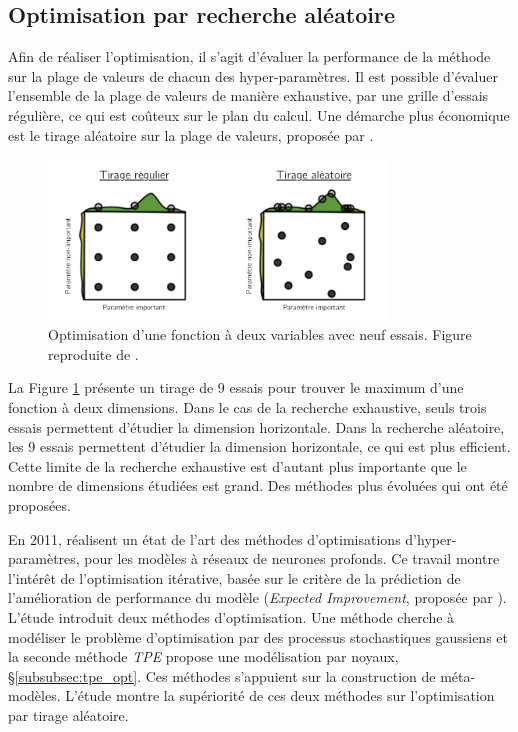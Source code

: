 \subsection{Optimisation par recherche aléatoire} \label{subsec:random_search}
Afin de réaliser l'optimisation, il s'agit d'évaluer la performance de la méthode sur la plage de valeurs de chacun des hyper-paramètres.
Il est possible d'évaluer l'ensemble de la plage de valeurs de manière exhaustive, par une grille d'essais régulière, ce qui est coûteux sur le plan du calcul.
Une démarche plus économique est le tirage aléatoire sur la plage de valeurs, proposée par \citeauthor{bergstra_random_2012} \cite{bergstra_random_2012}.

\begin{figure}[hbtp]
    \centering
    \includegraphics[width=0.80\textwidth,height=\textheight,keepaspectratio]{../Chap3/Figures/bergstra_RandomSearch2002.png}
    \caption{Optimisation d'une fonction à deux variables avec neuf essais. Figure reproduite de \cite{bergstra_random_2012}.}
    \label{fig:random_search}
\end{figure}

La Figure \ref{fig:random_search} présente un tirage de 9 essais pour trouver le maximum d'une fonction à deux dimensions.
Dans le cas de la recherche exhaustive, seuls trois essais permettent d'étudier la dimension horizontale.
Dans la recherche aléatoire, les 9 essais permettent d'étudier la dimension horizontale, ce qui est plus efficient.
Cette limite de la recherche exhaustive est d'autant plus importante que le nombre de dimensions étudiées est grand.
Des méthodes plus évoluées qui ont été proposées.


En 2011, \citeauthor{bergstra_algorithms_2011} \cite{bergstra_algorithms_2011} réalisent un état de l'art des méthodes d'optimisations d'hyper-paramètres, pour les modèles à réseaux de neurones profonds.
Ce travail montre l'intérêt de l'optimisation itérative, basée sur le critère de la prédiction de l'amélioration de performance du modèle (\textit{Expected Improvement}, proposée par \citeauthor{jones_taxonomy_2001} \cite{jones_taxonomy_2001}).
L'étude introduit deux méthodes d'optimisation.
Une méthode cherche à modéliser le problème d'optimisation par des processus stochastiques gaussiens et la seconde méthode \textit{TPE} propose une modélisation par noyaux, §\ref{subsubsec:tpe_opt}.
Ces méthodes s'appuient sur la construction de méta-modèles.
L'étude montre la supériorité de ces deux méthodes sur l'optimisation par tirage aléatoire.


